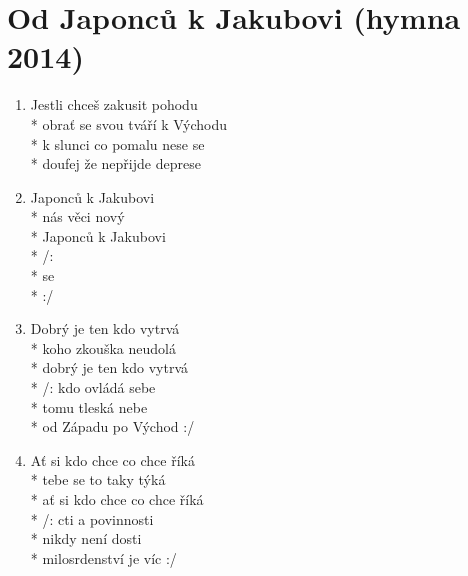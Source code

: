 \section{Od Japonců k Jakubovi (hymna 2014)}
\begin{enumerate}
\item[] Jestli chceš zakusit pohodu\\*
obra\v{t} se svou tváří k Východu\\*
k slunci co pomalu nese se\\*
doufej že nepřijde deprese
\item {} Japonců k Jakubovi\\*
 nás věci nový\\*
 Japonců k Jakubovi\\*
/:  \\*
 se \\*
   :/
\item Dobrý je ten kdo vytrvá\\*
koho zkouška neudolá\\*
dobrý je ten kdo vytrvá\\*
/: kdo ovládá sebe\\*
tomu tleská nebe\\*
od Západu po Východ :/
\item A\v{t} si kdo chce co chce říká\\*
tebe se to taky týká\\*
a\v{t} si kdo chce co chce říká\\*
/: cti a povinnosti\\*
nikdy není dosti\\*
milosrdenství je víc :/
\end{enumerate}
